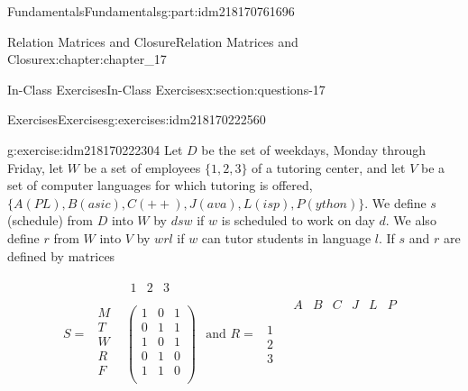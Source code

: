 \documentclass[oneside,10pt,]{book}
\numberwithin{equation}{section}
\begin{document}
\begin{partptx}{Fundamentals}{}{Fundamentals}{}{}{g:part:idm218170761696}
\begin{chapterptx}{Relation Matrices and Closure}{}{Relation Matrices and Closure}{}{}{x:chapter:chapter_17}
\begin{sectionptx}{In-Class Exercises}{}{In-Class Exercises}{}{}{x:section:questions-17}
\typeout{************************************************}
%
\begin{exercises-subsection-numberless}{Exercises}{}{Exercises}{}{}{g:exercises:idm218170222560}
\par\medskip\noindent%
%
\begin{exercisegroup}
\begin{divisionexerciseeg}{1}{}{}{g:exercise:idm218170222304}%
Let \(D\) be the set of weekdays, Monday through Friday, let \(W\) be a set of employees \(\{1, 2, 3\}\) of a tutoring center, and let \(V\) be a set of computer languages for which tutoring is offered,  \(\{A(PL), B(asic), C(++), J(ava), L(isp), P(ython)\}\). We define \(s\) (schedule) from \(D\) into \(W\) by \(d s w\) if \(w\) is scheduled to work on day \(d\). We also define \(r\) from \(W\) into \(V\) by \(w r l\) if \(w\) can tutor students in language \(l\). If \(s\) and \(r\) are defined by matrices%
\par
%
\begin{equation*}
S = 
\begin{array}{cc}
& 
\begin{array}{ccc}
1 & 2 & 3 \\
\end{array}
\\
\begin{array}{c}
M \\
T \\
W \\
R \\
F \\
\end{array}
& 
\left(
\begin{array}{ccc}
1 & 0 & 1 \\
0 & 1 & 1 \\
1 & 0 & 1 \\
0 & 1 & 0 \\
1 & 1 & 0 \\
\end{array}
\right) \\
\end{array}
\textrm{ and }R=
\begin{array}{cc}
& 
\begin{array}{cccccc}
A & B & C & J & L & P \\
\end{array}
\\
\begin{array}{c}
1 \\
2 \\
3 \\

\end{array}
\end{array}
\end{equation*}
\end{divisionexerciseeg}
\end{exercisegroup}
\end{exercises-subsection-numberless}
\end{sectionptx}
\end{chapterptx}
\end{partptx}
\end{document}
